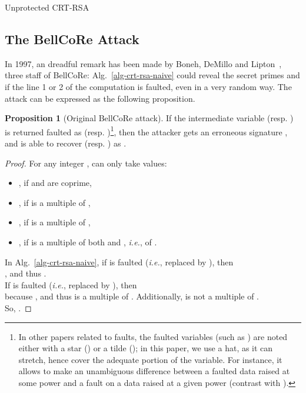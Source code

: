 \documentclass[10pt]{article}
\newcommand{\algorithmConfig}{
  \DontPrintSemicolon
	\SetKw{Or}{or}
	\SetKwInOut{Input}{Input}
	\SetKwInOut{Output}{Output}
}
\theoremstyle{definition}
\theoremstyle{theorem}
\newtheorem{proposition}{Proposition}
\newcommand{\ie}{\textit{i.e.}}
\begin{document}
\begin{algorithm}
\algorithmConfig
{}
\BlankLine
  \label{alg-crt-rsa-naive-recombination}
\Return  \;
\caption{Unprotected CRT-RSA}
\label{alg-crt-rsa-naive}
\end{algorithm}

\subsection{The BellCoRe Attack}

In 1997, an dreadful remark has been made by Boneh, DeMillo and Lipton~\cite{boneh-fault}, three staff of BellCoRe:
Alg.~\ref{alg-crt-rsa-naive} could reveal the secret primes  and  if the line 1 or 2 of the computation is faulted, even in a very random way.
The attack can be expressed as the following proposition.
\begin{proposition}[Original BellCoRe attack]
If the intermediate variable  (resp. ) is returned faulted as  (resp. )\footnote{In other papers related to faults, the faulted variables (such as ) are noted either with a star () or a tilde (); in this paper, we use a hat, as it can stretch, hence cover the adequate portion of the variable. For instance, it allows to make an unambiguous difference between a faulted data raised at some power and a fault on a data raised at a given power (contrast  with ).},
then the attacker gets an erroneous signature ,
and is able to recover  (resp. ) as .
\label{pro-bellcore2faults}
\end{proposition}
\begin{proof}
For any integer ,  can only take  values:
\begin{itemize}
\item , if  and  are coprime,
\item , if  is a multiple of ,
\item , if  is a multiple of ,
\item , if  is a multiple of both  and , \ie, of .
\end{itemize}
In Alg.~\ref{alg-crt-rsa-naive}, if  is faulted (\ie, replaced by ), then\\
,
and thus .\\
If  is faulted (\ie, replaced by ), then\\
 because , and thus  is a multiple of .
Additionally,  is not a multiple of .\\
So, .
\end{proof}
\end{document}
